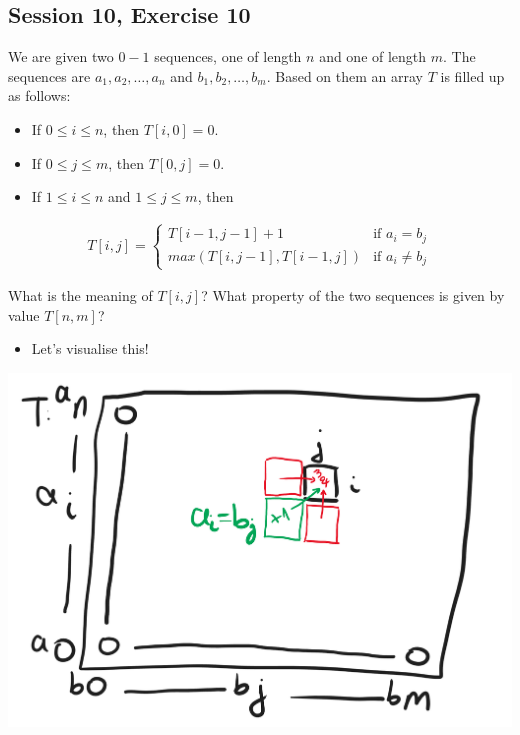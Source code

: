 \subsection {Session 10, Exercise 10}


We are given two $0-1$ sequences, one of length $n$ and one of length $m$. The sequences are $a_1,a_2,\dots{},a_n$ and $b_1,b_2,\dots{},b_m$. Based on them an array $T$ is filled up as follows:

\begin{itemize}
    \item If $0\leq{}i\leq{}n$, then $T[i,0] = 0$.
    \item If $0\leq{}j\leq{}m$, then $T[0,j] = 0$.
    \item If $1\leq{}i\leq{}n$ and $1\leq{}j\leq{}m$, then
\end{itemize}

\begin{align*}
T[i,j] =
\begin{cases}
T[i-1, j-1] + 1 & \text{if } a_i = b_j \\
max(T[i,j-1], T[i-1,j]) & \text{if } a_i \neq{} b_j
\end{cases}
\end{align*}

What is the meaning of $T[i,j]$? What property of the two sequences is given by value $T[n,m]$?


\begin{itemize}
\item Let's visualise this!
\end{itemize}

\begin{center}
\includegraphics[width=\linewidth]{10/10/t_visualise.png}
\end{center}

